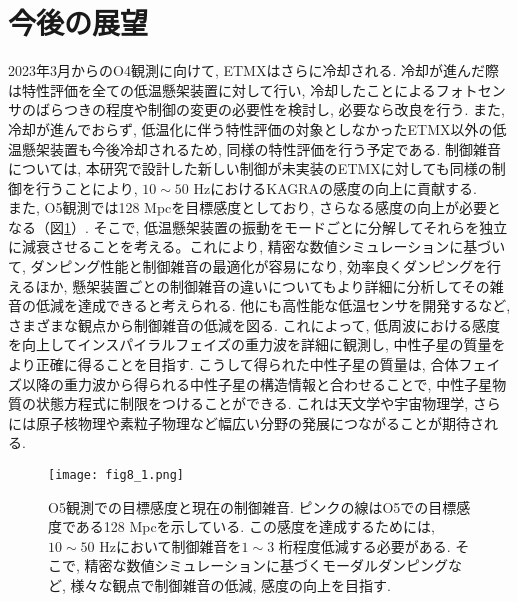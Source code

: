 \section{今後の展望}
2023年3月からのO4観測に向けて, ETMXはさらに冷却される. 冷却が進んだ際は特性評価を全ての低温懸架装置に対して行い, 冷却したことによるフォトセンサのばらつきの程度や制御の変更の必要性を検討し, 必要なら改良を行う. また, 冷却が進んでおらず, 低温化に伴う特性評価の対象としなかったETMX以外の低温懸架装置も今後冷却されるため, 同様の特性評価を行う予定である. 制御雑音については, 本研究で設計した新しい制御が未実装のETMXに対しても同様の制御を行うことにより, $10\sim50$ HzにおけるKAGRAの感度の向上に貢献する. \\
\quad また, O5観測では128 Mpcを目標感度としており, さらなる感度の向上が必要となる（図\ref{fig8.1}）. そこで, 低温懸架装置の振動をモードごとに分解してそれらを独立に減衰させることを考える。これにより, 精密な数値シミュレーションに基づいて, ダンピング性能と制御雑音の最適化が容易になり, 効率良くダンピングを行えるほか, 懸架装置ごとの制御雑音の違いについてもより詳細に分析してその雑音の低減を達成できると考えられる. 他にも高性能な低温センサを開発するなど, さまざまな観点から制御雑音の低減を図る. これによって, 低周波における感度を向上してインスパイラルフェイズの重力波を詳細に観測し, 中性子星の質量をより正確に得ることを目指す. こうして得られた中性子星の質量は, 合体フェイズ以降の重力波から得られる中性子星の構造情報と合わせることで, 中性子星物質の状態方程式に制限をつけることができる. これは天文学や宇宙物理学, さらには原子核物理や素粒子物理など幅広い分野の発展につながることが期待される.
\begin{figure}[H]
\begin{center}
\texttt{[image: fig8\_1.png]}
\caption[O5観測での目標感度と現在の制御雑音]{O5観測での目標感度と現在の制御雑音. ピンクの線はO5での目標感度である128 Mpcを示している. この感度を達成するためには, $10\sim50$ Hzにおいて制御雑音を$1\sim3$ 桁程度低減する必要がある. そこで, 精密な数値シミュレーションに基づくモーダルダンピングなど, 様々な観点で制御雑音の低減, 感度の向上を目指す.}
\label{fig8.1}
\end{center}
\end{figure}

